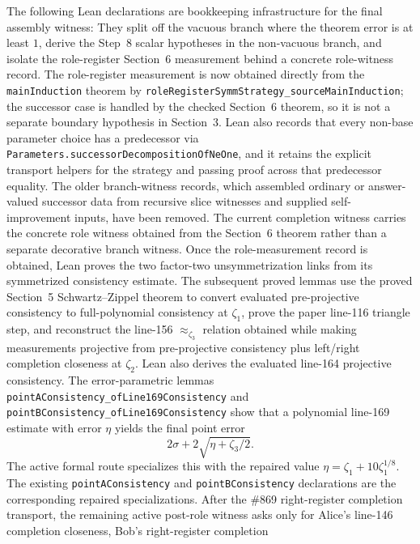 \begin{remark}\label{rem:main-formal-lean-witness-records}
The following Lean declarations are bookkeeping infrastructure for the final
assembly witness:
They split off the vacuous branch where the theorem error is at least $1$,
derive the Step~8 scalar hypotheses in the non-vacuous branch, and isolate the
role-register Section~6 measurement behind a concrete role-witness record.
	The role-register measurement is now obtained directly from the
	\texttt{mainInduction} theorem by
	\texttt{roleRegisterSymmStrategy\_sourceMainInduction}; the successor case is
	handled by the checked Section~6 theorem, so it is not a separate boundary
	hypothesis in Section~3.  Lean also records that every non-base
parameter choice has a predecessor via
\texttt{Parameters.successorDecompositionOfNeOne}, and it retains the explicit
transport helpers for the strategy and passing proof across that predecessor
equality.  The older branch-witness records, which assembled ordinary or
answer-valued successor data from recursive slice witnesses and supplied
self-improvement inputs, have been removed.  The current completion witness
carries the concrete role witness obtained from the Section~6
theorem rather than a separate decorative branch witness.  Once the
role-measurement record is obtained,
Lean proves the two factor-two unsymmetrization links from
its symmetrized consistency estimate.  The subsequent proved lemmas use the
proved Section~5 Schwartz--Zippel theorem to convert evaluated pre-projective
consistency to full-polynomial consistency at $\zeta_1$, prove the paper
line-116 triangle step, and reconstruct the line-156 $\approx_{\zeta_3}$
relation obtained while making measurements projective from pre-projective
consistency plus left/right completion closeness at $\zeta_2$.  Lean also
derives the evaluated line-164 projective consistency.  The error-parametric
lemmas
\texttt{pointAConsistency\_ofLine169Consistency} and
\texttt{pointBConsistency\_ofLine169Consistency} show that a polynomial
line-169 estimate with error $\eta$ yields the final point error
\[
  2\sigma + 2\sqrt{\eta+\zeta_3/2}.
\]
The active formal route specializes this with the repaired value
$\eta=\zeta_1+10\zeta_1^{1/8}$.  The existing
\texttt{pointAConsistency} and \texttt{pointBConsistency} declarations are the
corresponding repaired specializations.  After the \#869 right-register
completion transport, the remaining active post-role witness asks only for
Alice's line-146 completion closeness, Bob's right-register completion

\end{remark}
